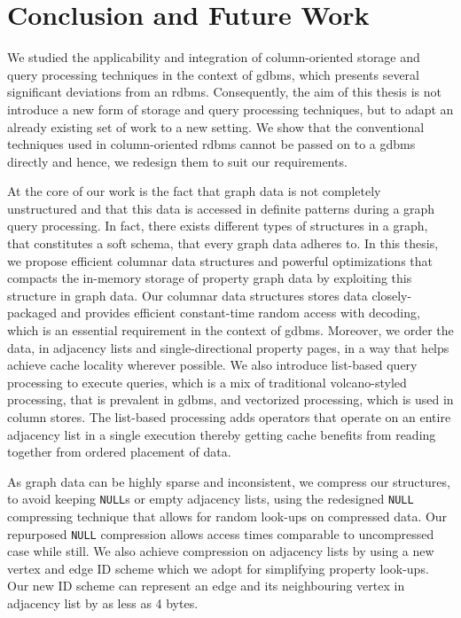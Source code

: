 \chapter{Conclusion and Future Work}
\label{c:conclusion-future-work}

We studied the applicability and integration of column-oriented storage and query processing techniques in the context of \gls{gdbms}, which presents several significant deviations from an \gls{rdbms}. Consequently, the aim of this thesis is not introduce a new form of storage and query processing techniques, but to adapt an already existing set of work to a new setting. We show that the conventional techniques used in column-oriented \gls{rdbms} cannot be passed on to a \gls{gdbms} directly and hence, we redesign them to suit our requirements. 

At the core of our work is the fact that graph data is not completely unstructured and that this data is accessed in definite patterns during a graph query processing. In fact, there exists different types of structures in a graph, that constitutes a soft schema, that every graph data adheres to. In this thesis, we propose efficient columnar data structures and powerful optimizations that compacts the in-memory storage of property graph data by exploiting this structure in graph data. Our columnar data structures stores data closely-packaged and provides efficient constant-time random access with decoding, which is an essential requirement in the context of \gls{gdbms}. Moreover, we order the data, in adjacency lists and single-directional property pages, in a way that helps achieve cache locality wherever possible. We also introduce list-based query processing to execute queries, which is a mix of traditional volcano-styled processing, that is prevalent in \gls{gdbms}, and vectorized processing, which is used in column stores. The list-based processing adds operators that operate on an entire adjacency list in a single execution thereby getting cache benefits from reading together from ordered placement of data.

As graph data can be highly sparse and inconsistent, we compress our structures, to avoid keeping \texttt{NULL}s or empty adjacency lists, using the redesigned \texttt{NULL} compressing technique that allows for random look-ups on compressed data. Our repurposed \texttt{NULL} compression allows access times comparable to uncompressed case while still. We also achieve compression on adjacency lists by using a new vertex and edge ID scheme which we adopt for simplifying property look-ups. Our new ID scheme can represent an edge and its neighbouring vertex in adjacency list by as less as 4 bytes.

